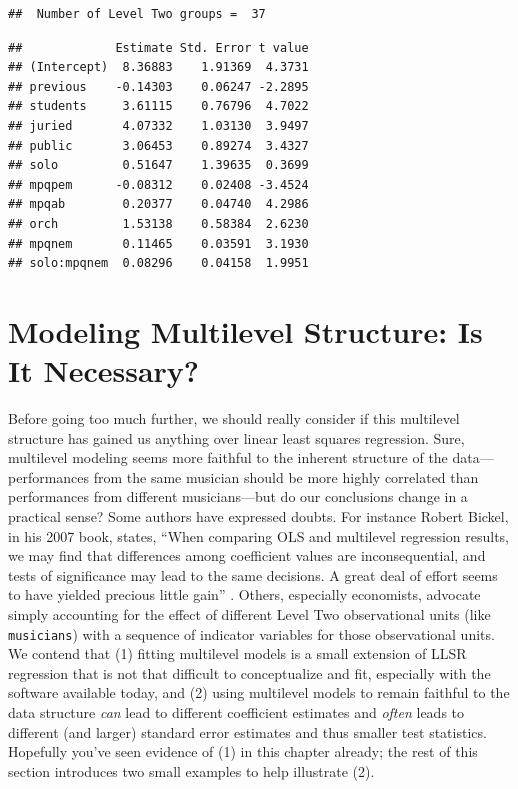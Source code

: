 \documentclass[
]{krantz}
\begin{document}
\begin{verbatim}
##  Number of Level Two groups =  37
\end{verbatim}

\begin{verbatim}
##             Estimate Std. Error t value
## (Intercept)  8.36883    1.91369  4.3731
## previous    -0.14303    0.06247 -2.2895
## students     3.61115    0.76796  4.7022
## juried       4.07332    1.03130  3.9497
## public       3.06453    0.89274  3.4327
## solo         0.51647    1.39635  0.3699
## mpqpem      -0.08312    0.02408 -3.4524
## mpqab        0.20377    0.04740  4.2986
## orch         1.53138    0.58384  2.6230
## mpqnem       0.11465    0.03591  3.1930
## solo:mpqnem  0.08296    0.04158  1.9951
\end{verbatim}

\hypertarget{multinecessary}{%
\section{Modeling Multilevel Structure: Is It Necessary?}\label{multinecessary}}

Before going too much further, we should really consider if this multilevel structure has gained us anything over linear least squares regression.  Sure, multilevel modeling  seems more faithful to the inherent structure of the data---performances from the same musician should be more highly correlated than performances from different musicians---but do our conclusions change in a practical sense? Some authors have expressed doubts. For instance Robert Bickel, in his 2007 book, states, ``When comparing OLS and multilevel regression results, we may find that differences among coefficient values are inconsequential, and tests of significance may lead to the same decisions. A great deal of effort seems to have yielded precious little gain'' \citep{Bickel2007}. Others, especially economists, advocate simply accounting for the effect of different Level Two observational units (like \texttt{musicians}) with a sequence of indicator variables for those observational units. We contend that (1) fitting multilevel models is a small extension of LLSR regression that is not that difficult to conceptualize and fit, especially with the software available today, and (2) using multilevel models to remain faithful to the data structure \emph{can} lead to different coefficient estimates and \emph{often} leads to different (and larger) standard error estimates and thus smaller test statistics. Hopefully you've seen evidence of (1) in this chapter already; the rest of this section introduces two small examples to help illustrate (2).
\end{document}
